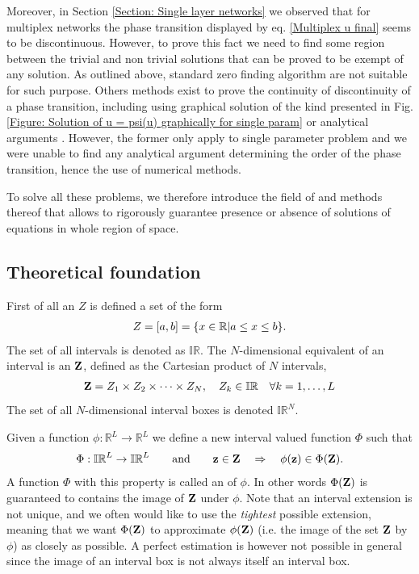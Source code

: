 \documentclass[
11pt, %
english, %
singlespacing, %
nolistspacing, %
liststotoc, %
headsepline, %
]{MastersDoctoralThesis} %
\begin{document}
Moreover, in Section \ref{Section: Single layer networks} we observed that for multiplex networks the phase transition displayed by eq. \eqref{Multiplex u final} seems to be discontinuous. However, to prove this fact we need to find some region between the trivial and non trivial solutions that can be proved to be exempt of any solution. As outlined above, standard zero finding algorithm are not suitable for such purpose. Others methods exist to prove the continuity of discontinuity of a phase transition, including using graphical solution of the kind presented in Fig. \ref{Figure: Solution of u = psi(u) graphically for single param} \cite{son2012percolation} or analytical arguments \cite{baxter2012avalanche}. However, the former only apply to single parameter problem and we were unable to find any analytical argument determining the order of the phase transition, hence the use of numerical methods.

To solve all these problems, we therefore introduce the field of  and methods thereof that allows to rigorously guarantee presence or absence of solutions of equations in whole region of space.

\subsection{Theoretical foundation}
\label{Section: Theoretical foundation of IA}

First of all an  $Z$ is defined a set of the form
\begin{align}
	Z = \left[a, b\right] = \{x \in \mathbb{R} | a \leq x \leq b\}.
\end{align}
The set of all intervals is denoted as $\mathbb{IR}$. The $N$-dimensional equivalent of an interval is an  $\boldsymbol{\mathrm{Z}}$, defined as the Cartesian product of $N$ intervals,
\begin{align}
	\boldsymbol{\mathrm{Z}} = Z_1 \times Z_2 \times \cdots \times Z_N, \quad Z_k \in \mathbb{IR} \quad \forall k = 1, \dots, L
\end{align}
The set of all $N$-dimensional interval boxes is denoted $\mathbb{IR}^N$.

Given a function $\phi : \mathbb{R}^L \rightarrow \mathbb{R}^L$ we define a new interval valued function $\Phi$ such that
\begin{align}
	\Phi : \mathbb{IR}^L \rightarrow \mathbb{IR}^L \qquad \text{and} \qquad \boldsymbol{\mathrm{z}} \in \boldsymbol{\mathrm{Z}} \quad \Rightarrow \quad \phi(\boldsymbol{\mathrm{z}}) \in \Phi(\boldsymbol{\mathrm{Z}}). \label{Definition interval extension}
\end{align}
A function $\Phi$ with this property is called an  of $\phi$. In other words $\Phi(\boldsymbol{\mathrm{Z}})$ is guaranteed to contains the image of $\boldsymbol{\mathrm{Z}}$ under $\phi$. Note that an interval extension is not unique, and we often would like to use the \emph{tightest} possible extension, meaning that we want $\Phi(\boldsymbol{\mathrm{Z}})$ to approximate $\phi(\boldsymbol{\mathrm{Z}})$ (i.e. the image of the set $\boldsymbol{\mathrm{Z}}$ by $\phi$) as closely as possible. A perfect estimation is however not possible in general since the image of an interval box is not always itself an interval box.
\end{document}
